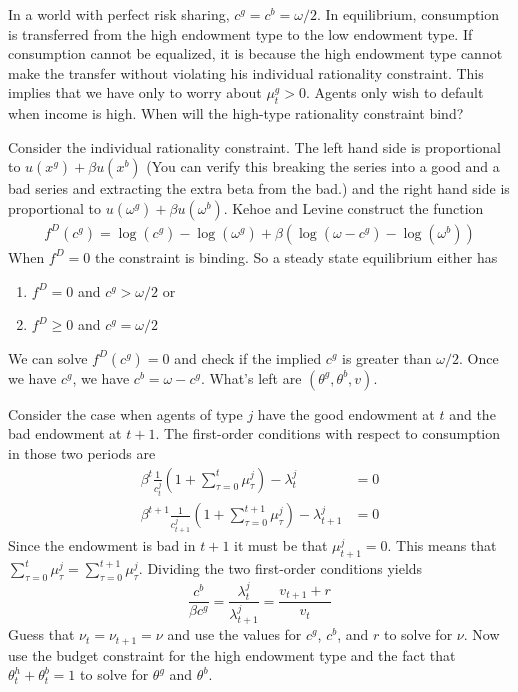 \documentclass[11pt, pdftex]{article}
\begin{document}
In a world with perfect risk sharing, ${c^g} = {c^b} = \omega/2$. In equilibrium, consumption is transferred from the high endowment type to the low endowment type.  If consumption cannot be equalized, it is because the high endowment type cannot make the transfer without violating his individual rationality constraint.  This implies that we have only to worry about $\mu _t^g > 0$.  Agents only wish to default when income is high.  When will the high-type rationality constraint bind?

Consider the individual rationality constraint.  The left hand side is proportional to $u\left( {{x^g}} \right) + \beta u\left( {{x^b}} \right)$ (You can verify this breaking the series into a good and a bad series and extracting the extra beta from the bad.)  and the right hand side is proportional to $u\left( {{\omega ^g}} \right) + \beta u\left( {{\omega ^b}} \right)$.  Kehoe and Levine construct the function
\begin{align}\label{}
  {f^D}\left( {{c^g}} \right) = \log \left( {{c^g}} \right) - \log \left( {{\omega ^g}} \right) + \beta \left( {\log \left( {\omega  - {c^g}} \right) - \log ( {{\omega ^b}}) } \right)
\end{align}
When ${f^D} = 0$ the constraint is binding.  So a steady state equilibrium either has
\begin{enumerate}
  \item ${f^D} = 0$ and ${c^g} > \omega/2$ or
  \item ${f^D} \geq 0$ and ${c^g} = \omega/2$
\end{enumerate}

We can solve ${f^D}\left( {{c^g}} \right) = 0$ and check if the implied $c^g$ is greater than $\omega/2$. Once we have $c^g$, we have $c^b=\omega-c^g$. What's left are $\left( {\theta ^g}, {\theta ^b}, v\right)$.

Consider the case when agents of type $j$ have the good endowment at $t$ and the bad endowment at $t + 1$.  The first-order conditions with respect to consumption in those two periods are
\begin{align}\label{}
{\beta ^t}\frac{1}{{c_t^j}}\left( {1 + \sum_{\tau  = 0}^t {\mu _\tau ^j} } \right) - \lambda _t^j &= 0\\
{\beta ^{t + 1}}\frac{1}{{c_{t + 1}^j}}\left( {1 + \sum_{\tau  = 0}^{t + 1} {\mu _\tau ^j} } \right) - \lambda _{t + 1}^j &= 0
\end{align}
Since the endowment is bad in $t + 1$ it must be that $\mu _{t + 1}^j = 0$. This means that
$\sum\nolimits_{\tau  = 0}^t {\mu _\tau^j}  = \sum\nolimits_{\tau  = 0}^{t + 1} {\mu _\tau^j} $. Dividing the two first-order conditions yields
\begin{equation}\label{}
\frac{{{c^b}}}{{\beta {c^g}}} = \frac{{\lambda _t^j}}{{\lambda _{t + 1}^j}} = \frac{{{v_{t + 1}} + r}}{{{v_t}}}
\end{equation}
Guess that ${\nu _t} = {\nu _{t + 1}} = \nu $ and use the values for ${c^g}$, ${c^b}$, and $r$ to solve for $\nu $.  Now use the budget constraint for the high endowment type and the fact that $\theta _t^h + \theta _t^b = 1$ to solve for ${\theta ^g}$ and ${\theta ^b}$.
\end{document}
